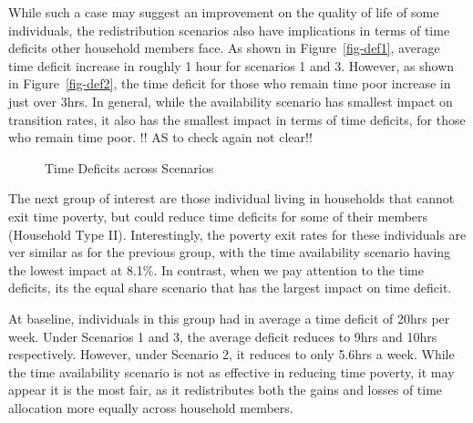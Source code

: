 \documentclass[
  11pt,
]{article}
\begin{document}
While such a case may suggest an improvement on the quality of life of
some individuals, the redistribution scenarios also have implications in
terms of time deficits other household members face. As shown in
Figure~\ref{fig-def1}, average time deficit increase in roughly 1 hour
for scenarios 1 and 3. However, as shown in Figure~\ref{fig-def2}, the
time deficit for those who remain time poor increase in just over 3hrs.
In general, while the availability scenario has smallest impact on
transition rates, it also has the smallest impact in terms of time
deficits, for those who remain time poor. !! AS to check again not
clear!!

\begin{figure}[H]


\caption{\label{fig-deficit}Time Deficits across Scenarios}

\end{figure}%

The next group of interest are those individual living in households
that cannot exit time poverty, but could reduce time deficits for some
of their members (Household Type II). Interestingly, the poverty exit
rates for these individuals are ver similar as for the previous group,
with the time availability scenario having the lowest impact at 8.1\%.
In contrast, when we pay attention to the time deficits, its the equal
share scenario that has the largest impact on time deficit.

At baseline, individuals in this group had in average a time deficit of
20hrs per week. Under Scenarios 1 and 3, the average deficit reduces to
9hrs and 10hrs respectively. However, under Scenario 2, it reduces to
only 5.6hrs a week. While the time availability scenario is not as
effective in reducing time poverty, it may appear it is the most fair,
as it redistributes both the gains and losses of time allocation more
equally across household members.
\end{document}
